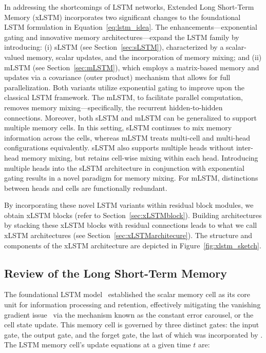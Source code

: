 In addressing the shortcomings of LSTM networks, Extended Long Short-Term Memory (xLSTM) incorporates two significant changes to the foundational LSTM formulation in Equation~\eqref{eq:lstm_idea}. The enhancements—exponential gating and innovative memory architectures—expand the LSTM family by introducing: (i) sLSTM (see Section~\ref{sec:sLSTM}), characterized by a scalar-valued memory, scalar updates, and the incorporation of memory mixing; and (ii) mLSTM (see Section~\ref{sec:mLSTM}), which employs a matrix-based memory and updates via a covariance (outer product) mechanism that allows for full parallelization. Both variants utilize exponential gating to improve upon the classical LSTM framework. The mLSTM, to facilitate parallel computation, removes memory mixing—specifically, the recurrent hidden-to-hidden connections. Moreover, both sLSTM and mLSTM can be generalized to support multiple memory cells. In this setting, sLSTM continues to mix memory information across the cells, whereas mLSTM treats multi-cell and multi-head configurations equivalently. sLSTM also supports multiple heads without inter-head memory mixing, but retains cell-wise mixing within each head. Introducing multiple heads into the sLSTM architecture in conjunction with exponential gating results in a novel paradigm for memory mixing. For mLSTM, distinctions between heads and cells are functionally redundant.

By incorporating these novel LSTM variants within residual block modules, we obtain xLSTM blocks (refer to Section~\ref{sec:xLSTMblock}). Building architectures by stacking these xLSTM blocks with residual connections leads to what we call xLSTM architectures (see Section~\ref{sec:xLSTMarchitecure}). The structure and components of the xLSTM architecture are depicted in Figure~\ref{fig:xlstm_sketch}.

\subsection{Review of the Long Short-Term Memory}
\label{sec:orgLSTM}

The foundational LSTM model~\citep{Hochreiter:91,Hochreiter:97nips,Hochreiter:97} established the scalar memory cell as its core unit for information processing and retention, effectively mitigating the vanishing gradient issue~\citep{Hochreiter:91,Hochreiter:00book} via the mechanism known as the constant error carousel, or the cell state update. This memory cell is governed by three distinct gates: the input gate, the output gate, and the forget gate, the last of which was incorporated by \citet{Gers:00}. 
The LSTM memory cell's update equations at a given time $t$ are:


